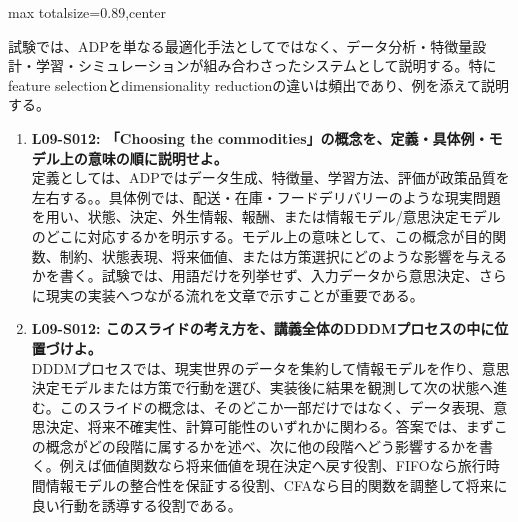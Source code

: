 \begin{minipage}[t]{0.58\textwidth}
\begin{adjustbox}{max totalsize={\textwidth}{0.89\textheight},center}
\begin{minipage}{\textwidth}
試験では、ADPを単なる最適化手法としてではなく、データ分析・特徴量設計・学習・シミュレーションが組み合わさったシステムとして説明する。特にfeature selectionとdimensionality reductionの違いは頻出であり、例を添えて説明する。\par{}\begin{enumerate}\item \textbf{L09-S012: 「Choosing the commodities」の概念を、定義・具体例・モデル上の意味の順に説明せよ。}\\定義としては、ADPではデータ生成、特徴量、学習方法、評価が政策品質を左右する。。具体例では、配送・在庫・フードデリバリーのような現実問題を用い、状態、決定、外生情報、報酬、または情報モデル/意思決定モデルのどこに対応するかを明示する。モデル上の意味として、この概念が目的関数、制約、状態表現、将来価値、または方策選択にどのような影響を与えるかを書く。試験では、用語だけを列挙せず、入力データから意思決定、さらに現実の実装へつながる流れを文章で示すことが重要である。\item \textbf{L09-S012: このスライドの考え方を、講義全体のDDDMプロセスの中に位置づけよ。}\\DDDMプロセスでは、現実世界のデータを集約して情報モデルを作り、意思決定モデルまたは方策で行動を選び、実装後に結果を観測して次の状態へ進む。このスライドの概念は、そのどこか一部だけではなく、データ表現、意思決定、将来不確実性、計算可能性のいずれかに関わる。答案では、まずこの概念がどの段階に属するかを述べ、次に他の段階へどう影響するかを書く。例えば価値関数なら将来価値を現在決定へ戻す役割、FIFOなら旅行時間情報モデルの整合性を保証する役割、CFAなら目的関数を調整して将来に良い行動を誘導する役割である。\end{enumerate}
\end{minipage}
\end{adjustbox}
\end{minipage}


